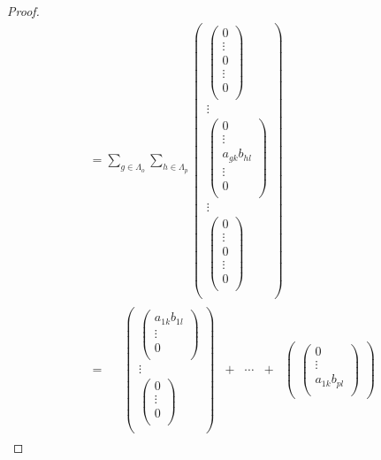\documentclass[dvipdfmx]{jsarticle}
\begin{document}
\begin{proof}
\begin{align*}
&= \sum_{g \in \varLambda_{o}} {\sum_{h \in \varLambda_{p}} \begin{pmatrix}
\begin{pmatrix}
0 \\
 \vdots \\
0 \\
 \vdots \\
0 \\
\end{pmatrix} \\
 \vdots \\
\begin{pmatrix}
0 \\
 \vdots \\
a_{gk}b_{hl} \\
 \vdots \\
0 \\
\end{pmatrix} \\
 \vdots \\
\begin{pmatrix}
0 \\
 \vdots \\
0 \\
 \vdots \\
0 \\
\end{pmatrix} \\
\end{pmatrix}}\\
&= \begin{matrix}
\  & \begin{pmatrix}
\begin{pmatrix}
a_{1k}b_{1l} \\
 \vdots \\
0 \\
\end{pmatrix} \\
 \vdots \\
\begin{pmatrix}
0 \\
 \vdots \\
0 \\
\end{pmatrix} \\
\end{pmatrix} & + & \cdots & + & \begin{pmatrix}
\begin{pmatrix}
0 \\
 \vdots \\
a_{1k}b_{pl} \\

\end{pmatrix}
\end{pmatrix}
\end{matrix}
\end{align*}
\end{proof}
\end{document}
